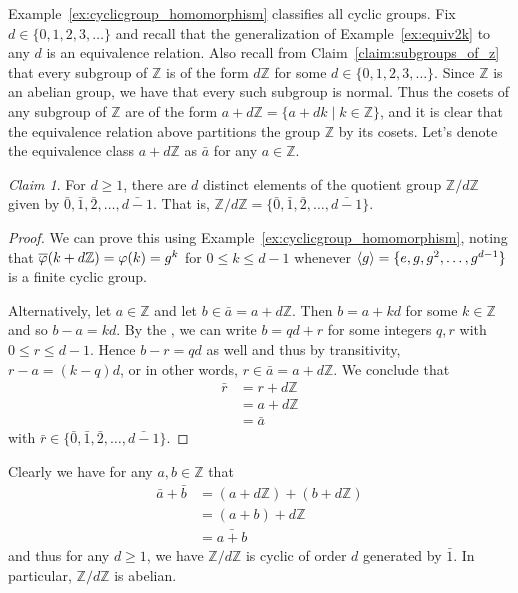 \documentclass[12pt,letterpaper,DIV=11,final]{scrartcl}
\theoremstyle{plain}
\theoremstyle{definition}
\theoremstyle{remark}
\newtheorem{claim}{Claim}
\begin{document}
Example~\ref{ex:cyclicgroup_homomorphism} classifies all cyclic groups.
Fix $d \in \{ 0, 1, 2, 3, \dots \}$ and recall that the generalization of Example~\ref{ex:equiv2k} to any $d$ is an equivalence relation.
Also recall from Claim~\ref{claim:subgroups_of_z} that every subgroup of $\mathbb{Z}$ is of the form $d \mathbb{Z}$ for some $d \in \{ 0, 1, 2, 3, \dots \}$.
Since $\mathbb{Z}$ is an abelian group, we have that every such subgroup is normal.
Thus the cosets of any subgroup of $\mathbb{Z}$ are of the form $a + d \mathbb{Z} = \{ a + dk \mid k \in \mathbb{Z} \}$,
and it is clear that the equivalence relation above partitions the group $\mathbb{Z}$ by its cosets.
Let's denote the equivalence class $a + d \mathbb{Z}$ as $\bar{a}$ for any $a \in \mathbb{Z}$.

\begin{claim}
  For $d \geq 1$, there are $d$ distinct elements of the quotient group $\mathbb{Z}/d \mathbb{Z}$ given by $\bar{0}, \bar{1}, \bar{2}, \dots, \bar{d - 1}$.
  That is, $\mathbb{Z}/d \mathbb{Z} = \{ \bar{0}, \bar{1}, \bar{2}, \dots, \bar{d - 1} \}$.

  \begin{proof}
    We can prove this using Example~\ref{ex:cyclicgroup_homomorphism}, noting that $\overline{\varphi}(k + d \mathbb{Z}) = \varphi(k) = g^k$ for $0 \leq k \leq d - 1$ whenever $\braket{g} = \{ e, g, g^2, \dots, g^{d - 1} \}$ is a finite cyclic group.

    Alternatively, let $a \in \mathbb{Z}$ and let $b \in \bar{a} = a + d \mathbb{Z}$.
    Then $b = a + kd$ for some $k \in \mathbb{Z}$ and so $b - a = kd$.
    By the , we can write $b = qd + r$ for some integers $q, r$ with $0 \leq r \leq d - 1$.
    Hence $b - r = qd$ as well and thus by transitivity, $r - a = (k - q) d$, or in other words, $r \in \bar{a} = a + d \mathbb{Z}$.
    We conclude that
    \begin{align*}
      \bar{r} &= r + d \mathbb{Z} \\
              &= a + d \mathbb{Z} \\
              &= \bar{a}
    \end{align*}
    with $\bar{r} \in \{ \bar{0}, \bar{1}, \bar{2}, \dots, \bar{d - 1} \}$.
  \end{proof}
\end{claim}

Clearly we have for any $a, b \in \mathbb{Z}$ that
\begin{align*}
  \bar{a} + \bar{b} &= (a + d \mathbb{Z}) + (b + d \mathbb{Z}) \\
                    &= (a + b) + d \mathbb{Z} \\
                    &= \bar{a + b}
\end{align*}
and thus for any $d \geq 1$, we have $\mathbb{Z}/d \mathbb{Z}$ is cyclic of order $d$ generated by $\bar{1}$.
In particular, $\mathbb{Z}/d \mathbb{Z}$ is abelian.
\end{document}
